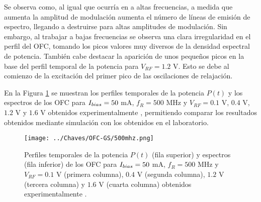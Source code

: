 		Se observa como, al igual que ocurría en a altas frecuencias, a medida que aumenta la amplitud de modulación aumenta el n\'umero de l\'ineas de emisión de espectro, llegando a destruirse para altas amplitudes de modulación. Sin embargo, al trabajar a bajas frecuencias se observa una clara irregularidad en el perfil del OFC, tomando los picos valores muy diversos de la densidad espectral de potencia. Tambi\'en cabe destacar la aparici\'on de unos pequeños picos en la base del perfil temporal de la potencia para $V_{RF} = 1.2$ V. Esto se debe al comienzo de la excitación del primer pico de las oscilaciones de relajación.		

		En la Figura \ref{Img:500mhz} se muestran los perfiles temporales de la potencia $P(t)$ y los espectros de los OFC para $I_{bias} = 50$ mA, $f_R = 500$ MHz y $V_{RF} = 0.1$ V, $0.4$ V, $1.2$ V y $1.6$ V obtenidos experimentalmente \cite{Chaves19}, permitiendo comparar los resultados obtenidos mediante simulación con los obtenidos en el laboratorio.

			\begin{figure}[H]
				\centering
				\texttt{[image: ../Chaves/OFC-GS/500mhz.png]}
				\vspace{-1.5cm}
				\caption{\label{Img:500mhz}Perfiles temporales de la potencia $P(t)$ (fila superior) y espectros (fila inferior) de los OFC para $I_{bias} = 50$ mA, $f_R = 500$ MHz y $V_{RF} = 0.1$ V (primera columna), $0.4$ V (segunda columna), $1.2$ V (tercera columna) y $1.6$ V (cuarta columna) obtenidos experimentalmente \cite{Chaves19}.}	
			\end{figure}

